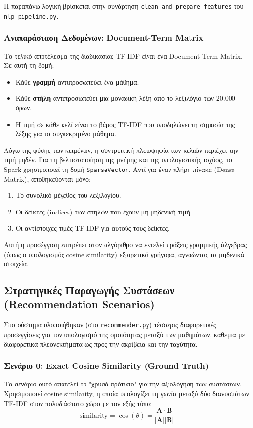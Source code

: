 \documentclass[a4paper,12pt]{article}
\begin{document}
Η παραπάνω λογική βρίσκεται στην συνάρτηση \texttt{clean\_and\_prepare\_features} του \texttt{nlp\_pipeline.py}. 

\subsubsection{Αναπαράσταση Δεδομένων: Document-Term Matrix}
Το τελικό αποτέλεσμα της διαδικασίας TF-IDF είναι ένα Document-Term Matrix. Σε αυτή τη δομή:
\begin{itemize}
    \item Κάθε \textbf{γραμμή} αντιπροσωπεύει ένα μάθημα.
    \item Κάθε \textbf{στήλη} αντιπροσωπεύει μια μοναδική λέξη από το λεξιλόγιο των 20.000 όρων.
    \item Η τιμή σε κάθε κελί είναι το βάρος TF-IDF που υποδηλώνει τη σημασία της λέξης για το συγκεκριμένο μάθημα.
\end{itemize}

Λόγω της φύσης των κειμένων, η συντριπτική πλειοψηφία των κελιών περιέχει την τιμή μηδέν. Για τη βελτιστοποίηση της μνήμης και της υπολογιστικής ισχύος, το Spark χρησιμοποιεί τη δομή \texttt{SparseVector}. Αντί για έναν πλήρη πίνακα (Dense Matrix), αποθηκεύονται μόνο:
\begin{enumerate}
    \item Το συνολικό μέγεθος του λεξιλογίου.
    \item Οι δείκτες (indices) των στηλών που έχουν μη μηδενική τιμή.
    \item Οι αντίστοιχες τιμές TF-IDF για αυτούς τους δείκτες.
\end{enumerate}
Αυτή η προσέγγιση επιτρέπει στον αλγόριθμο να εκτελεί πράξεις γραμμικής άλγεβρας (όπως ο υπολογισμός cosine similarity) εξαιρετικά γρήγορα, αγνοώντας τα μηδενικά στοιχεία.

\subsection{Στρατηγικές Παραγωγής Συστάσεων (Recommendation Scenarios)}
Στο σύστημα υλοποιήθηκαν (στο \texttt{recommender.py}) τέσσερις διαφορετικές προσεγγίσεις για τον υπολογισμό της ομοιότητας μεταξύ των μαθημάτων, καθεμία με διαφορετικά πλεονεκτήματα ως προς την ακρίβεια και την ταχύτητα. 

\subsubsection{Σενάριο 0: Exact Cosine Similarity (Ground Truth)} Το σενάριο αυτό αποτελεί το "χρυσό πρότυπο" για την αξιολόγηση των συστάσεων. Χρησιμοποιεί cosine similarity, η οποία υπολογίζει τη γωνία μεταξύ δύο διανυσμάτων TF-IDF στον πολυδιάστατο χώρο με τον εξής τύπο:
\begin{equation}
    \text{similarity} = \cos(\theta) = \frac{\mathbf{A} \cdot \mathbf{B}}{|\mathbf{A}| |\mathbf{B}|} 
\end{equation}
\end{document}
